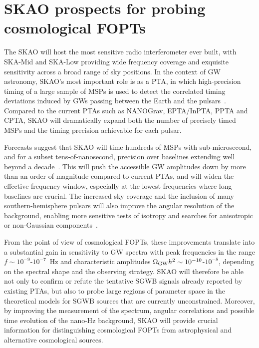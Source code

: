 \documentclass[a4paper,11pt]{article}
\begin{document}
\section{SKAO prospects for probing cosmological FOPTs}
\label{sec:skao-prospects}

The SKAO will host the most sensitive radio interferometer ever built, with SKA-Mid and SKA-Low providing wide 
frequency coverage and exquisite sensitivity across a broad range of sky positions. In the context of GW astronomy, 
SKAO’s most important role is as a PTA, in which high-precision timing of a large sample of MSPs is used to detect 
the correlated timing deviations induced by GWs passing between the Earth and the pulsars~\citep{Detweiler:1979wn,Weltman:2020gw,Janssen:2015SKA,Stappers:2018rsta}. Compared to the 
current PTAs such as NANOGrav, EPTA/InPTA, PPTA and CPTA, SKAO will dramatically expand both the number of precisely 
timed MSPs and the timing precision achievable for each pulsar.

Forecasts suggest that SKAO will time hundreds of MSPs with sub-microsecond, and for a subset tens-of-nanosecond, precision 
over baselines extending well beyond a decade~\citep{Janssen:2015SKA,Weltman:2020gw,Stappers:2018rsta}. This will push 
the accessible GW amplitudes down by more than an order of magnitude compared to current PTAs, and will widen the effective
frequency window, especially at the lowest frequencies where long baselines are crucial. The increased sky coverage and the
inclusion of many southern-hemisphere pulsars will also improve the angular resolution of the background, enabling more
sensitive tests of isotropy and searches for anisotropic or non-Gaussian components~\citep{Gair:2013PTAGW}.

From the point of view of cosmological FOPTs, these improvements translate into a substantial gain in sensitivity to GW 
spectra with peak frequencies in the range $f\sim 10^{-9}$-$10^{-7}$~Hz and characteristic amplitudes 
$\Omega_{\rm GW} h^2 \sim 10^{-10}$-$10^{-8}$, depending on the spectral shape and the observing strategy. SKAO will 
therefore be able not only to confirm or refute the tentative SGWB signals already reported by existing PTAs, but also 
to probe large regions of parameter space in the theoretical models for SGWB sources that are currently unconstrained. 
Moreover, by improving the measurement of the spectrum, angular correlations and possible time evolution of the nano-Hz
background, SKAO will provide crucial information for distinguishing cosmological FOPTs from astrophysical and alternative
cosmological sources.
\end{document}
